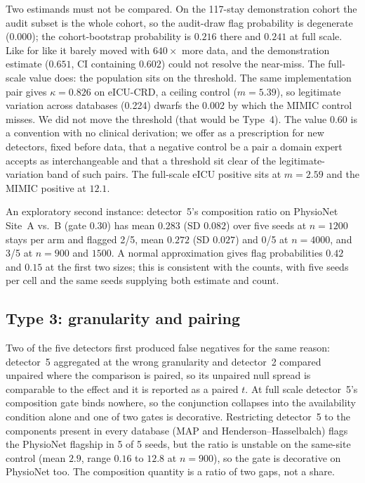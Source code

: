 \documentclass[pmlr,twocolumn,10pt]{jmlr}
\begin{document}
Two estimands must not be compared. On the 117-stay demonstration cohort the
audit subset is the whole cohort, so the audit-draw flag probability is
degenerate ($0.000$); the cohort-bootstrap probability is $0.216$ there and
$0.241$ at full scale. Like for like it barely moved with $640\times$ more data,
and the demonstration estimate ($0.651$, CI containing $0.602$) could not
resolve the near-miss. The full-scale value does: the population sits on the
threshold. The same implementation pair gives $\kappa=0.826$ on eICU-CRD, a
ceiling control ($m=5.39$), so legitimate variation across databases (0.224)
dwarfs the 0.002 by which the MIMIC control misses. We did not move the threshold
(that would be Type~4). The value $0.60$ is a convention with no clinical
derivation; we offer as a prescription for new detectors, fixed before data,
that a negative control be a pair a domain expert accepts as interchangeable and
that a threshold sit clear of the legitimate-variation band of such pairs. The
full-scale eICU positive sits at $m=2.59$ and the MIMIC positive at $12.1$.

An exploratory second instance: detector~5's composition ratio on PhysioNet
Site~A vs.~B (gate $0.30$) has mean $0.283$ (SD $0.082$) over five seeds at
$n=1200$ stays per arm and flagged 2/5, mean $0.272$ (SD $0.027$) and 0/5 at
$n=4000$, and 3/5 at $n=900$ and $1500$. A normal approximation gives flag
probabilities $0.42$ and $0.15$ at the first two sizes; this is consistent with
the counts, with five seeds per cell and the same seeds supplying both
estimate and count.

\subsection{Type 3: granularity and pairing}

Two of the five detectors first produced false negatives for the same reason:
detector~5 aggregated at the wrong granularity and detector~2 compared unpaired
where the comparison is paired, so its unpaired null spread is comparable to
the effect and it is reported as a paired $t$. At full scale detector~5's
composition gate binds nowhere, so the conjunction collapses into the availability
condition alone and one of two gates is decorative. Restricting detector~5 to the
components present in every database (MAP and Henderson--Hasselbalch) flags the
PhysioNet flagship in 5 of 5 seeds, but the ratio is unstable on the same-site
control (mean $2.9$, range $0.16$ to $12.8$ at $n=900$), so the gate is
decorative on PhysioNet too. The composition quantity is a ratio of two gaps,
not a share.
\end{document}
